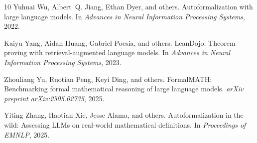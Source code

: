 \documentclass[11pt]{article}
\begin{document}
\begin{thebibliography}{10}
Yuhuai Wu, Albert~Q. Jiang, Ethan Dyer, and others.
\newblock Autoformalization with large language models.
\newblock In \emph{Advances in Neural Information Processing Systems}, 2022.

Kaiyu Yang, Aidan Huang, Gabriel Poesia, and others.
\newblock LeanDojo: Theorem proving with retrieval-augmented language models.
\newblock In \emph{Advances in Neural Information Processing Systems}, 2023.

Zhouliang Yu, Ruotian Peng, Keyi Ding, and others.
\newblock FormalMATH: Benchmarking formal mathematical reasoning of large
  language models.
\newblock \emph{arXiv preprint arXiv:2505.02735}, 2025.

Yiting Zhang, Haotian Xie, Jesse Alama, and others.
\newblock Autoformalization in the wild: Assessing LLMs on real-world
  mathematical definitions.
\newblock In \emph{Proceedings of EMNLP}, 2025.

\end{thebibliography}
\end{document}
